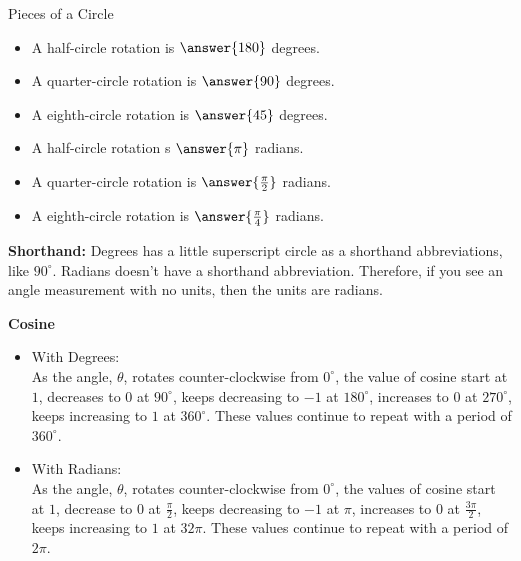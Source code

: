 \documentclass{ximera}
\begin{document}
\begin{question} Pieces of a Circle
	\begin{itemize}
		\item A half-circle rotation is $\answer{180}$ degrees.
		\item A quarter-circle rotation is $\answer{90}$ degrees.
		\item A eighth-circle rotation is $\answer{45}$ degrees.
		\item A half-circle rotation s $\answer{\pi}$ radians.
		\item A quarter-circle rotation is $\answer{\frac{\pi}{2}}$ radians.
		\item A eighth-circle rotation is $\answer{\frac{\pi}{4}}$ radians.

	\end{itemize}
\end{question}


\textbf{Shorthand:}  Degrees has a little superscript circle as a shorthand abbreviations, like $90^\circ$.  Radians doesn't have a shorthand abbreviation.  Therefore, if you see an angle measurement with no units, then the units are radians. 

\begin{idea} \textbf{\textcolor{green!50!black}{Cosine}}
\begin{itemize}
\item With Degrees: \\
As the angle, $\theta$, rotates counter-clockwise from $0^\circ$, the value of cosine start at $1$, decreases to $0$ at $90^\circ$, keeps decreasing to $-1$ at $180^\circ$, increases to $0$ at $270^\circ$, keeps increasing to $1$ at $360^\circ$.  These values continue to repeat with a period of $360^\circ$.

\item With Radians: \\
As the angle, $\theta$, rotates counter-clockwise from $0^\circ$, the values of cosine start at $1$, decrease to $0$ at $\frac{\pi}{2}$, keeps decreasing to $-1$ at $\pi$, increases to $0$ at $\frac{3\pi}{2}$, keeps increasing to $1$ at $32\pi$.  These values continue to repeat with a period of $2\pi$.
\end{itemize}
\end{idea}
\end{document}
